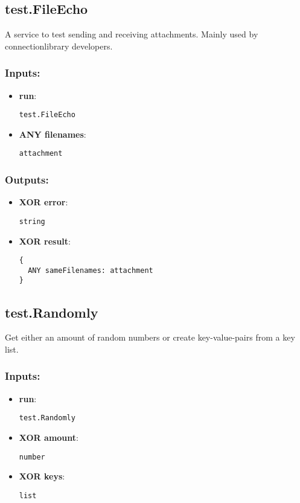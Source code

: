 \subsection{test.FileEcho}
\label{ch:builtinservices:test.FileEcho}
A service to test sending and receiving attachments. Mainly used by connectionlibrary developers.
\subsubsection*{Inputs:}
\begin{itemize}
  \small
    \item \textbf{run}: 
\begin{lstlisting}
test.FileEcho
\end{lstlisting}
    \item \textbf{ANY filenames}: 
\begin{lstlisting}
attachment
\end{lstlisting}
  \end{itemize}
\subsubsection*{Outputs:}
\begin{itemize}
  \small
    \item \textbf{XOR error}: 
\begin{lstlisting}
string
\end{lstlisting}
    \item \textbf{XOR result}: 
\begin{lstlisting}
{
  ANY sameFilenames: attachment
}
\end{lstlisting}
  \end{itemize}

\subsection{test.Randomly}
\label{ch:builtinservices:test.Randomly}
Get either an amount of random numbers or create key-value-pairs from a key list.
\subsubsection*{Inputs:}
\begin{itemize}
  \small
    \item \textbf{run}: 
\begin{lstlisting}
test.Randomly
\end{lstlisting}
    \item \textbf{XOR amount}: 
\begin{lstlisting}
number
\end{lstlisting}
    \item \textbf{XOR keys}: 
\begin{lstlisting}
list
\end{lstlisting}
  \end{itemize}
